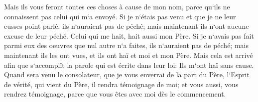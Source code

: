 \verse Mais ils vous feront toutes ces choses à cause de mon nom, parce qu`ils ne connaissent pas celui qui m`a envoyé. 
\verse Si je n`étais pas venu et que je ne leur eusses point parlé, ils n`auraient pas de péché; mais maintenant ils n`ont aucune excuse de leur péché. 
\verse Celui qui me hait, hait aussi mon Père. 
\verse Si je n`avais pas fait parmi eux des oeuvres que nul autre n`a faites, ils n`auraient pas de péché; mais maintenant ils les ont vues, et ils ont haï et moi et mon Père. 
\verse Mais cela est arrivé afin que s`accomplît la parole qui est écrite dans leur loi: Ils m`ont haï sans cause. 
\verse Quand sera venu le consolateur, que je vous enverrai de la part du Père, l`Esprit de vérité, qui vient du Père, il rendra témoignage de moi; 
\verse et vous aussi, vous rendrez témoignage, parce que vous êtes avec moi dès le commencement. 

